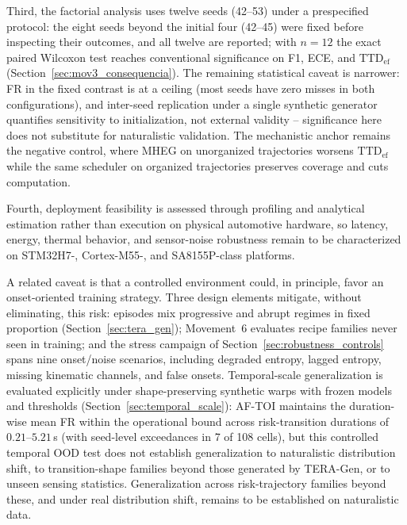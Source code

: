 \documentclass[a4paper,fleqn]{cas-dc}
\newcommand{\TERAGen}{\mbox{TERA-Gen}\xspace}
\newcommand{\MHEG}{\mbox{MHEG}\xspace}
\begin{document}
{\color{\revcolor}Third, the factorial analysis uses twelve seeds (42--53)
under a prespecified protocol: the eight seeds beyond the initial four
(42--45) were fixed before inspecting their outcomes, and all twelve
are reported; with $n=12$ the exact paired
Wilcoxon test reaches conventional significance on F1, ECE, and
$\mathrm{TTD}_{\mathrm{ef}}$ (Section~\ref{sec:mov3_consequencia}). The
remaining statistical caveat is narrower: FR in the fixed contrast is at a
ceiling (most seeds have zero misses in both configurations), and inter-seed
replication under a single synthetic generator quantifies sensitivity to
initialization, not external validity -- significance here does not substitute
for naturalistic validation. The mechanistic anchor remains the negative
control, where \MHEG on unorganized trajectories worsens
$\mathrm{TTD}_{\mathrm{ef}}$ while the same scheduler on organized
trajectories preserves coverage and cuts computation.}

Fourth, deployment feasibility is assessed through profiling and
analytical estimation rather than execution on physical automotive hardware, so
latency, energy, thermal behavior, and sensor-noise robustness remain to be
characterized on STM32H7-, Cortex-M55-, and SA8155P-class platforms.

{\color{\revcolor}A related caveat is that a controlled environment could, in
principle, favor an onset-oriented training strategy. Three design elements
mitigate, without eliminating, this risk: episodes mix progressive and abrupt
regimes in fixed proportion (Section~\ref{sec:tera_gen}); Movement~6 evaluates
recipe families never seen in training; and the stress campaign of
Section~\ref{sec:robustness_controls} spans nine onset/noise scenarios,
including degraded entropy, lagged entropy, missing kinematic channels, and
false onsets. Temporal-scale generalization is evaluated explicitly under
shape-preserving synthetic warps with frozen models and thresholds
(Section~\ref{sec:temporal_scale}): \mbox{AF-TOI} maintains the
duration-wise mean FR within the operational bound across risk-transition
durations of $0.21$--$5.21$\,s (with seed-level exceedances in 7 of 108
cells), but this controlled temporal OOD test does not establish
generalization to naturalistic distribution shift, to transition-shape
families beyond those generated by \TERAGen, or to unseen sensing
statistics. Generalization across risk-trajectory families beyond these, and
under real distribution shift, remains to be established on naturalistic
data.}
\end{document}
